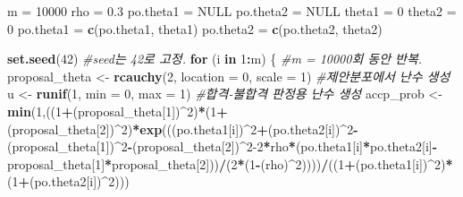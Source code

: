 \documentclass[
]{article}
\newenvironment{Shaded}{\begin{snugshade}}{\end{snugshade}}
\newcommand{\AttributeTok}[1]{\textcolor[rgb]{0.13,0.29,0.53}{#1}}
\newcommand{\CommentTok}[1]{\textcolor[rgb]{0.56,0.35,0.01}{\textit{#1}}}
\newcommand{\ConstantTok}[1]{\textcolor[rgb]{0.56,0.35,0.01}{#1}}
\newcommand{\ControlFlowTok}[1]{\textcolor[rgb]{0.13,0.29,0.53}{\textbf{#1}}}
\newcommand{\DecValTok}[1]{\textcolor[rgb]{0.00,0.00,0.81}{#1}}
\newcommand{\FloatTok}[1]{\textcolor[rgb]{0.00,0.00,0.81}{#1}}
\newcommand{\FunctionTok}[1]{\textcolor[rgb]{0.13,0.29,0.53}{\textbf{#1}}}
\newcommand{\NormalTok}[1]{#1}
\newcommand{\OtherTok}[1]{\textcolor[rgb]{0.56,0.35,0.01}{#1}}
\newcommand{\SpecialCharTok}[1]{\textcolor[rgb]{0.81,0.36,0.00}{\textbf{#1}}}
\begin{document}
\begin{Shaded}
\begin{Highlighting}[]
\NormalTok{m }\OtherTok{=} \DecValTok{10000}
\NormalTok{rho }\OtherTok{=} \FloatTok{0.3}
\NormalTok{po.theta1 }\OtherTok{=} \ConstantTok{NULL}
\NormalTok{po.theta2 }\OtherTok{=} \ConstantTok{NULL}
\NormalTok{theta1 }\OtherTok{=} \DecValTok{0}
\NormalTok{theta2 }\OtherTok{=} \DecValTok{0}
\NormalTok{po.theta1 }\OtherTok{=} \FunctionTok{c}\NormalTok{(po.theta1, theta1)}
\NormalTok{po.theta2 }\OtherTok{=} \FunctionTok{c}\NormalTok{(po.theta2, theta2) }

\FunctionTok{set.seed}\NormalTok{(}\DecValTok{42}\NormalTok{) }\CommentTok{\#seed는 42로 고정.}
\ControlFlowTok{for}\NormalTok{ (i }\ControlFlowTok{in} \DecValTok{1}\SpecialCharTok{:}\NormalTok{m) \{ }\CommentTok{\#m = 10000회 동안 반복.}
\NormalTok{  proposal\_theta }\OtherTok{\textless{}{-}} \FunctionTok{rcauchy}\NormalTok{(}\DecValTok{2}\NormalTok{, }\AttributeTok{location =} \DecValTok{0}\NormalTok{, }\AttributeTok{scale =} \DecValTok{1}\NormalTok{) }\CommentTok{\#제안분포에서 난수 생성}
\NormalTok{  u }\OtherTok{\textless{}{-}} \FunctionTok{runif}\NormalTok{(}\DecValTok{1}\NormalTok{, }\AttributeTok{min =} \DecValTok{0}\NormalTok{, }\AttributeTok{max =} \DecValTok{1}\NormalTok{) }\CommentTok{\#합격{-}불합격 판정용 난수 생성}
\NormalTok{  accp\_prob }\OtherTok{\textless{}{-}} \FunctionTok{min}\NormalTok{(}\DecValTok{1}\NormalTok{,((}\DecValTok{1}\SpecialCharTok{+}\NormalTok{(proposal\_theta[}\DecValTok{1}\NormalTok{])}\SpecialCharTok{\^{}}\DecValTok{2}\NormalTok{)}\SpecialCharTok{*}\NormalTok{(}\DecValTok{1}\SpecialCharTok{+}\NormalTok{(proposal\_theta[}\DecValTok{2}\NormalTok{])}\SpecialCharTok{\^{}}\DecValTok{2}\NormalTok{)}\SpecialCharTok{*}\FunctionTok{exp}\NormalTok{(((po.theta1[i])}\SpecialCharTok{\^{}}\DecValTok{2}\SpecialCharTok{+}\NormalTok{(po.theta2[i])}\SpecialCharTok{\^{}}\DecValTok{2}\SpecialCharTok{{-}}\NormalTok{(proposal\_theta[}\DecValTok{1}\NormalTok{])}\SpecialCharTok{\^{}}\DecValTok{2}\SpecialCharTok{{-}}\NormalTok{(proposal\_theta[}\DecValTok{2}\NormalTok{])}\SpecialCharTok{\^{}}\DecValTok{2{-}2}\SpecialCharTok{*}\NormalTok{rho}\SpecialCharTok{*}\NormalTok{(po.theta1[i]}\SpecialCharTok{*}\NormalTok{po.theta2[i]}\SpecialCharTok{{-}}\NormalTok{proposal\_theta[}\DecValTok{1}\NormalTok{]}\SpecialCharTok{*}\NormalTok{proposal\_theta[}\DecValTok{2}\NormalTok{]))}\SpecialCharTok{/}\NormalTok{(}\DecValTok{2}\SpecialCharTok{*}\NormalTok{(}\DecValTok{1}\SpecialCharTok{{-}}\NormalTok{(rho)}\SpecialCharTok{\^{}}\DecValTok{2}\NormalTok{))))}\SpecialCharTok{/}\NormalTok{((}\DecValTok{1}\SpecialCharTok{+}\NormalTok{(po.theta1[i])}\SpecialCharTok{\^{}}\DecValTok{2}\NormalTok{)}\SpecialCharTok{*}\NormalTok{(}\DecValTok{1}\SpecialCharTok{+}\NormalTok{(po.theta2[i])}\SpecialCharTok{\^{}}\DecValTok{2}\NormalTok{)))}

\end{Highlighting}
\end{Shaded}
\end{document}
